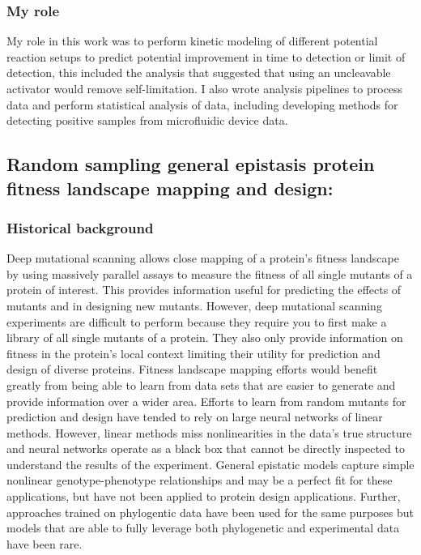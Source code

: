 \documentclass{article}
\begin{document}
\subsubsection{My role}
My role in this work was to perform kinetic modeling of different potential reaction setups to predict potential improvement in time to detection or limit of detection, this included the analysis that suggested that using an uncleavable activator would remove self-limitation.
I also wrote analysis pipelines to process data and perform statistical analysis of data, including developing methods for detecting positive samples from microfluidic device data.
%
\nocite{Liu2021-pu}
\printbibliography[heading=none]

\leavevmode\newline

\subsection{Random sampling general epistasis protein fitness landscape mapping and design:}
\subsubsection{Historical background}
Deep mutational scanning allows close mapping of a protein's fitness landscape by using massively parallel assays to measure the fitness of all single mutants of a protein of interest.
This provides information useful for predicting the effects of mutants and in designing new mutants.
However, deep mutational scanning experiments are difficult to perform because they require you to first make a library of all single mutants of a protein.
They also only provide information on fitness in the protein's local context limiting their utility for prediction and design of diverse proteins.
Fitness landscape mapping efforts would benefit greatly from being able to learn from data sets that are easier to generate and provide information over a wider area.
Efforts to learn from random mutants for prediction and design have tended to rely on large neural networks of linear methods.
However, linear methods miss nonlinearities in the data's true structure and neural networks operate as a black box that cannot be directly inspected to understand the results of the experiment.
General epistatic models capture simple nonlinear genotype-phenotype relationships and may be a perfect fit for these applications, but have not been applied to protein design applications.
Further, approaches trained on phylogentic data have been used for the same purposes but models that are able to fully leverage both phylogenetic and experimental data have been rare.
%
\end{document}
